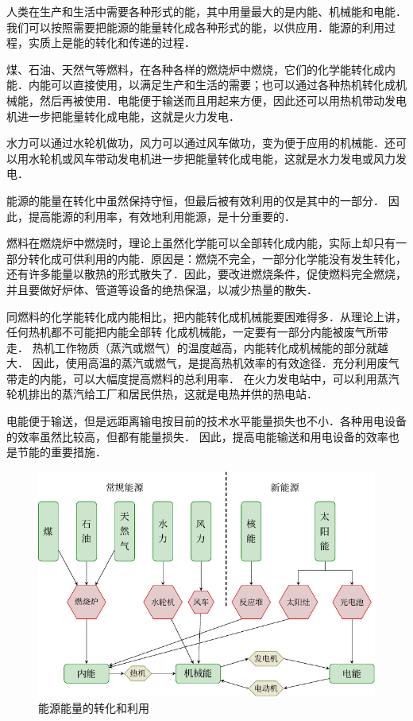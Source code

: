 人类在生产和生活中需要各种形式的能，其中用量最大的是内能、机械能和电能．我们可以按照需要把能源的能量转化成各种形式的能，以供应用．能源的利用过程，实质上是能的转化和传递的过程．

煤、石油、天然气等燃料，在各种各样的燃烧炉中燃烧，它们的化学能转化成内能．内能可以直接使用，以满足生产和生活的需要；也可以通过各种热机转化成机械能，然后再被使用．电能便于输送而且用起来方便，因此还可以用热机带动发电机进一步把能量转化成电能，这就是火力发电．

水力可以通过水轮机做功，风力可以通过风车做功，变为便于应用的机械能．还可以用水轮机或风车带动发电机进一步把能量转化成电能，这就是水力发电或风力发电．

能源的能量在转化中虽然保持守恒，但最后被有效利用的仅是其中的一部分．
因此，提高能源的利用率，有效地利用能源，是十分重要的．

燃料在燃烧炉中燃烧时，理论上虽然化学能可以全部转化成内能，实际上却只有一部分转化成可供利用的内能．原因是：燃烧不完全，一部分化学能没有发生转化，还有许多能量以散热的形式散失了．因此，要改进燃烧条件，促使燃料完全燃烧，并且要做好炉体、管道等设备的绝热保温，以减少热量的散失．

同燃料的化学能转化成内能相比，把内能转化成机械能要困难得多．从理论上讲，任何热机都不可能把内能全部转
化成机械能，一定要有一部分内能被废气所带走．
热机工作物质（蒸汽或燃气）的温度越高，内能转化成机械能的部分就越大．
因此，使用高温的蒸汽或燃气，是提高热机效率的有效途径．充分利用废气带走的内能，可以大幅度提高燃料的总利用率．
在火力发电站中，可以利用蒸汽轮机排出的蒸汽给工厂和居民供热，这就是电热并供的热电站．

电能便于输送，但是远距离输电按目前的技术水平能量损失也不小．各种用电设备的效率虽然比较高，但都有能量损失．
因此，提高电能输送和用电设备的效率也是节能的重要措施．

\begin{figure}[htbp]
    \centering
    \includegraphics{fig/B/2-3.pdf}
    \caption{能源能量的转化和利用}\label{fig_B_2-3}
\end{figure}

